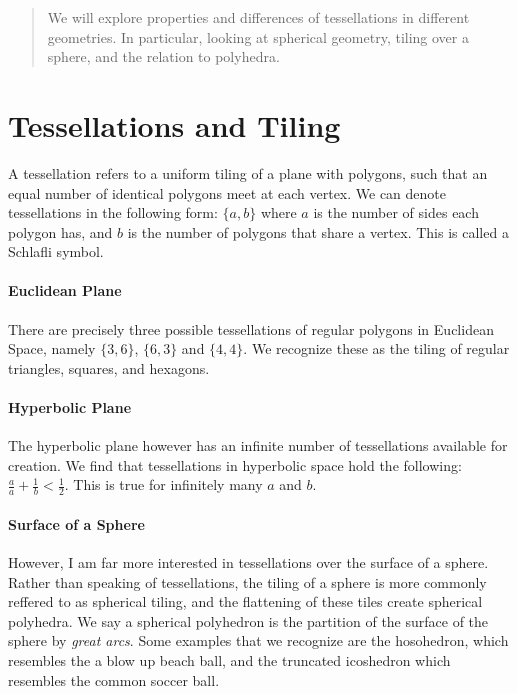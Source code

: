\documentclass[12pt]{article}
\begin{document}
	\maketitle
	
	\begin{abstract}
		We will explore properties and differences of tessellations in different geometries. In particular, looking at spherical geometry, tiling over a sphere, and the relation to polyhedra. 
	\end{abstract}
	
	\section{Tessellations and Tiling}
		A tessellation refers to a uniform tiling of a plane with polygons, such that an equal number of identical polygons meet at each vertex. We can denote tessellations in the following form: $\{a, b\}$ where $a$ is the number of sides each polygon has, and $b$ is the number of polygons that share a vertex. This is called a Schlafli symbol. 
		
	\paragraph{Euclidean Plane}
		There are precisely three possible tessellations of regular polygons in Euclidean Space, namely $\{3, 6\}$, 
		$\{6,3\}$ and $\{4,4\}$. We recognize these as the tiling of regular triangles, squares, and hexagons. 
	
	\paragraph{Hyperbolic Plane}
		The hyperbolic plane however has an infinite number of tessellations available for creation. We find that tessellations in hyperbolic space hold the following: $\frac{a}{a} + \frac{1}{b} < \frac{1}{2}$. This is true for infinitely many $a$ and $b$.  
	
	\paragraph{Surface of a Sphere}
		However, I am far more interested in tessellations over the surface of a sphere. Rather than speaking of tessellations, the tiling of a sphere is more commonly reffered to as spherical tiling, and the flattening of these tiles create spherical polyhedra. We say a spherical polyhedron is the partition of the surface of the sphere by \textit{great arcs}. Some examples that we recognize are the hosohedron, which resembles the a blow up beach ball, and the truncated icoshedron which resembles the common soccer ball. 
	
\end{document}
